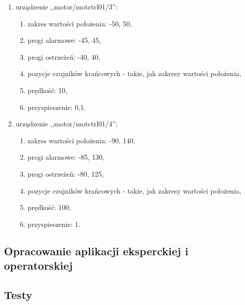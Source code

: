 \begin{enumerate}
\begin{enumerate}
		\item urządzenie ,,motor/motctrl01/3'':
		\begin{enumerate}
			\item zakres wartości położenia: -50, 50,
			\item progi alarmowe: -45, 45,
			\item progi ostrzeżeń: -40, 40,
			\item pozycje czujników krańcowych - takie, jak zakresy wartości położenia,
			\item prędkość: 10,
			\item przyspieszenie: 0,1.
		\end{enumerate}
		\item urządzenie ,,motor/motctrl01/4'':
		\begin{enumerate}
			\item zakres wartości położenia: -90, 140,
			\item progi alarmowe: -85, 130,
			\item progi ostrzeżeń: -80, 125,
			\item pozycje czujników krańcowych - takie, jak zakresy wartości położenia,
			\item prędkość: 100,
			\item przyspieszenie: 1.
		\end{enumerate}
	\end{enumerate}
\end{enumerate}

\subsection{Opracowanie aplikacji eksperckiej i operatorskiej}


\subsection{Testy}